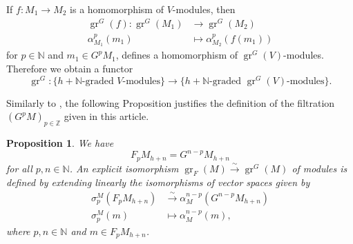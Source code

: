 \documentclass[a4paper, 12pt, reqno]{amsart}
\newtheorem{proposition}[theorem]{Proposition}
\theoremstyle{remark}
\DeclareMathOperator{\gr}{gr}
\begin{document}
If $f: M_1 \to M_2$ is a homomorphism of $V$-modules, then
\begin{align*}
  \gr^G(f): \gr^G(M_1) &\to \gr^G(M_2) \\
  \alpha^p_{M_1}(m_1) &\mapsto \alpha^p_{M_2}(f(m_1))
\end{align*}
for $p \in \mathbb{N}$ and $m_1 \in G^pM_1$, defines a homomorphism of $\gr^G(V)$-modules.
Therefore we obtain a functor
\begin{equation*}
  \gr^G: \{\text{$h + \mathbb{N}$-graded $V$-modules}\} \to \{\text{$h + \mathbb{N}$-graded $\gr^G(V)$-modules}\}.
\end{equation*}

Similarly to , the following Proposition justifies the definition of the filtration $(G^pM)_{p \in \mathbb{Z}}$ given in this article.

\begin{proposition}
  \label{prp:6}
  We have
  \begin{equation*}
    F_pM_{h + n} = G^{n - p}M_{h + n}
  \end{equation*}
  for all $p, n \in \mathbb{N}$.
  An explicit isomorphism $\gr_F(M) \xrightarrow{\sim} \gr^G(M)$ of modules is defined by extending linearly the isomorphisms of vector spaces given by
  \begin{align*}
    \sigma^M_p(F_pM_{h + n}) &\xrightarrow{\sim} \alpha^{n - p}_M(G^{n - p}M_{h + n}) \\
    \sigma^M_p(m) &\mapsto \alpha^{n - p}_M(m),
  \end{align*}
  where $p, n \in \mathbb{N}$ and $m \in F_pM_{h + n}$.
\end{proposition}
\end{document}

